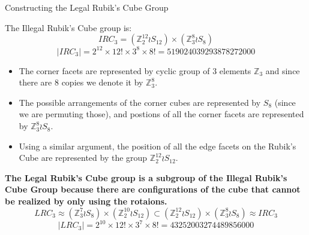 \documentclass[final]{beamer}
\newlength{\colwidth}
\begin{document}
\begin{frame}[t]
\begin{columns}[t]
\begin{column}{\colwidth}
\begin{block}{Constructing the Legal Rubik's Cube Group}

    The Illegal Rubik's Cube group is:
    $$IRC_{3} = (\mathbb{Z}^{12}_2 \wr S_{12}) \times (\mathbb{Z}^8_3 \wr S_8)$$
    $$|IRC_{3}| = 2^{12} \times 12! \times 3^8 \times 8! = 519024039293878272000$$

\begin{itemize}
\item The corner facets are represented by cyclic group of 3 elements $\mathbb{Z}_{3}$ and since there are $8$ copies we denote it by $\mathbb{Z}_3 ^8$.
\item The possible arrangements of the corner cubes are represented by $S_{8}$ (since we are permuting those), and postions of all the corner facets are represented by $\mathbb{Z}_{3}^{8} \wr S_{8}$.
\item Using a similar argument, the position of all the edge facets on the Rubik's Cube are represented by the group $\mathbb{Z}^{12}_{2} \wr S_{12}$.
\end{itemize}

    \textbf{The Legal Rubik's Cube group is a subgroup of the Illegal Rubik's Cube Group because there are configurations of the cube that cannot be realized by only using the rotaions.}
$$LRC_{3} \approx (\mathbb{Z}_{3}^{7} \wr S_{8}) \times (\mathbb{Z}_{2}^{10} \wr S_{12}) \subset  (\mathbb{Z}^{12}_2 \wr S_{12}) \times (\mathbb{Z}^8_3 \wr S_8) \approx IRC_{3}$$
$$ |LRC_{3}| = 2^{10} \times 12! \times 3^7 \times 8! = 43252003274489856000$$













\end{block}
\end{column}
\end{columns}
\end{frame}
\end{document}
